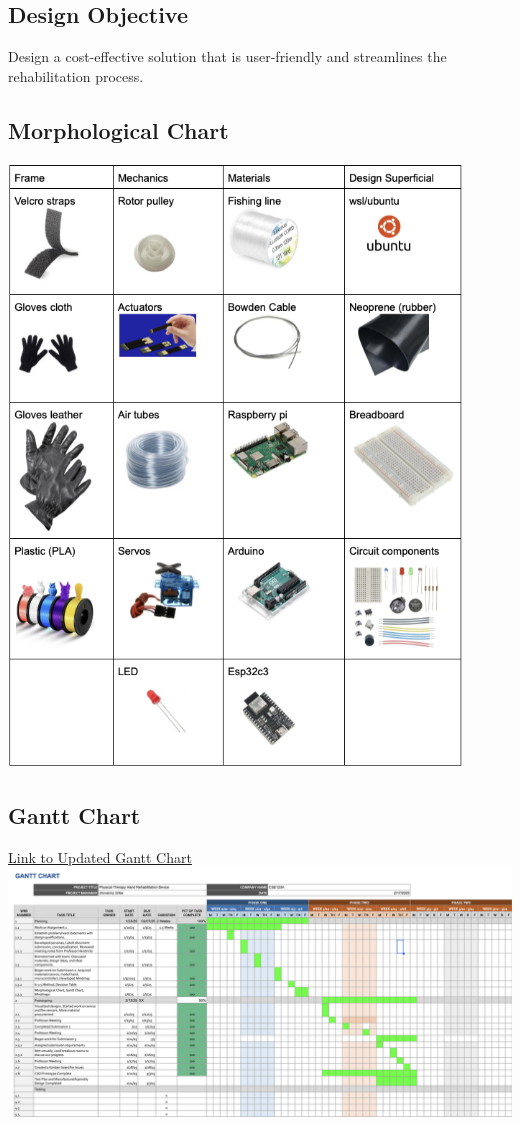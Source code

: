 \documentclass{article}
\begin{document}
\subsection{Design Objective}
Design a cost-effective solution that is user-friendly and streamlines the rehabilitation process.
\subsection{Morphological Chart}
\includegraphics[width=12cm]{morpho.png}
\subsection{Gantt Chart}
\href{https://docs.google.com/spreadsheets/d/12JjnpXyDDq8c87AdqVN5jQ46xVcHvgcuxsZTP0hWSw0/edit?usp=sharing}{Link to Updated Gantt Chart}
\newline
\newline
\includegraphics[width=1.5\textwidth]{Gantt Chart pic.png}
\end{document}
